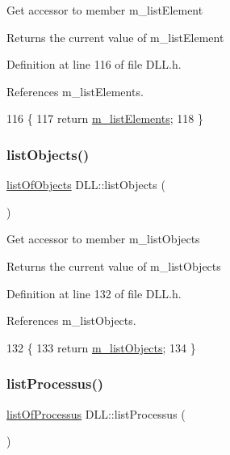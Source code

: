 Get accessor to member m\+\_\+list\+Element \begin{DoxyReturn}{Returns}
the current value of m\+\_\+list\+Element 
\end{DoxyReturn}


Definition at line 116 of file D\+L\+L.\+h.



References m\+\_\+list\+Elements.


\begin{DoxyCode}
116                                  \{
117     \textcolor{keywordflow}{return} \hyperlink{classDLL_a2e88d7167245fd7b6a000817583643ed}{m\_listElements};
118   \}
\end{DoxyCode}
\mbox{\label{classDLL_a3bde9f46fc00bcc1b0a22558cf0447da}} 
\subsubsection{\texorpdfstring{list\+Objects()}{listObjects()}}
{\footnotesize\ttfamily \hyperlink{classDLL_a68629aa6f9103c5a3082511ff8218b1e}{list\+Of\+Objects} D\+L\+L\+::list\+Objects (\begin{DoxyParamCaption}{ }\end{DoxyParamCaption})\hspace{0.3cm}{\ttfamily [inline]}}

Get accessor to member m\+\_\+list\+Objects \begin{DoxyReturn}{Returns}
the current value of m\+\_\+list\+Objects 
\end{DoxyReturn}


Definition at line 132 of file D\+L\+L.\+h.



References m\+\_\+list\+Objects.


\begin{DoxyCode}
132                                \{
133     \textcolor{keywordflow}{return} \hyperlink{classDLL_af48201f52f29a849489e0104a440bcbb}{m\_listObjects};
134   \}
\end{DoxyCode}
\mbox{\label{classDLL_a52eb21bf2ac1a61ae8ae41663ce4c3f8}} 
\subsubsection{\texorpdfstring{list\+Processus()}{listProcessus()}}
{\footnotesize\ttfamily \hyperlink{classDLL_aded1b0bb41b288ed4f34cb6d6632d486}{list\+Of\+Processus} D\+L\+L\+::list\+Processus (\begin{DoxyParamCaption}{ }\end{DoxyParamCaption})\hspace{0.3cm}{\ttfamily [inline]}}

